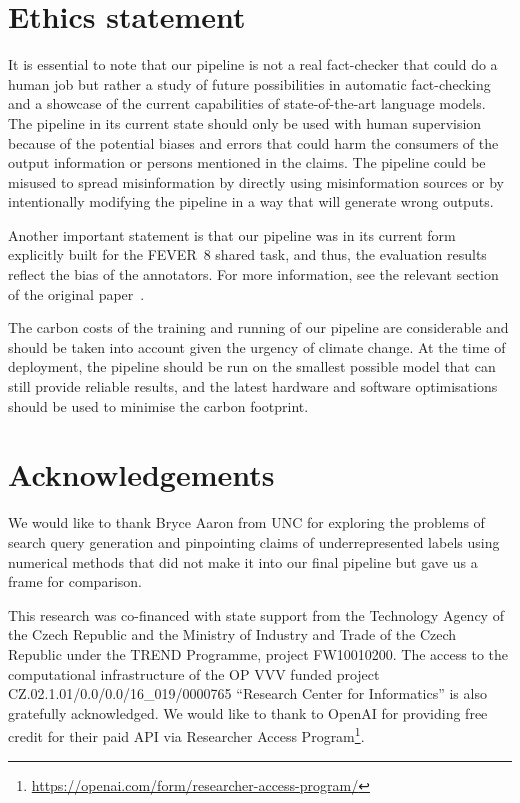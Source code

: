 \documentclass[11pt]{article}
\newcommand{\review}[1]{{\color{black}#1}}
\newcommand{\averitec}{FEVER~8}
\begin{document}
\section*{Ethics statement}
It is essential to note that our pipeline is not a real fact-checker that could do a human job but rather a study of future possibilities in automatic fact-checking and a showcase of the current capabilities of state-of-the-art language models. The pipeline in its current state should only be used with human supervision because of the potential biases and errors that could harm the consumers of the output information or persons mentioned in the claims. The pipeline could be misused to spread misinformation by directly using misinformation sources or by intentionally modifying the pipeline in a way that will generate wrong outputs.

Another important statement is that our pipeline was in its current form explicitly built for the \averitec{} shared task, and thus, the evaluation results reflect the bias of the annotators. For more information, see the relevant section of the original paper~\cite{averitec2024}.

The carbon costs of the training and running of our pipeline are considerable and should be taken into account given the urgency of climate change. At the time of deployment, the pipeline should be run on the smallest possible model that can still provide reliable results, and the latest hardware and software optimisations should be used to minimise the carbon footprint.

\section*{Acknowledgements}
We would like to thank Bryce Aaron from UNC for exploring the problems of search query generation and pinpointing claims of underrepresented labels using numerical methods that did not make it into our final pipeline but gave us a frame for comparison. 

This research was co-financed with state support from the Technology Agency of the Czech Republic and the Ministry of Industry and Trade of the Czech Republic under the TREND Programme, project FW10010200.
The access to the computational infrastructure of the OP VVV funded project CZ.02.1.01/0.0/0.0/16\_019/0000765 ``Research Center for Informatics'' is also gratefully acknowledged.
We would like to thank to \mbox{OpenAI} for providing free credit for their paid API via Researcher Access Program\footnote{\review{\url{https://openai.com/form/researcher-access-program/}}}.






\appendix


%
%
\end{document}
